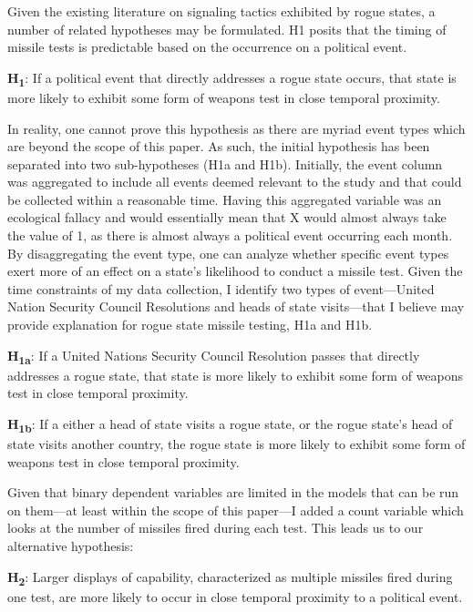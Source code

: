 \documentclass[12pt]{article}
\begin{document}
Given the existing literature on signaling tactics exhibited by rogue states, a number of related hypotheses may be formulated. H1 posits that the timing of missile tests is predictable based on the occurrence on a political event. 

\singlespacing
\textbf{H\textsubscript{1}}: If a political event that directly addresses a rogue state occurs, that state is more likely to exhibit some form of weapons test in close temporal proximity. 

\doublespacing
In reality, one cannot prove this hypothesis as there are myriad event types which are beyond the scope of this paper. As such, the initial hypothesis has been separated into two sub-hypotheses (H1a and H1b). Initially, the event column was aggregated to include all events deemed relevant to the study and that could be collected within a reasonable time. Having this aggregated variable was an ecological fallacy and would essentially mean that X would almost always take the value of 1, as there is almost always a political event occurring each month. By disaggregating the event type, one can analyze whether specific event types exert more of an effect on a state’s likelihood to conduct a missile test. Given the time constraints of my data collection, I identify two types of event—United Nation Security Council Resolutions and heads of state visits—that I believe may provide explanation for rogue state missile testing, H1a and H1b. 

\singlespacing
\textbf{H\textsubscript{1a}}: If a United Nations Security Council Resolution passes that directly addresses a rogue state, that state is more likely to exhibit some form of weapons test in close temporal proximity.

\textbf{H\textsubscript{1b}}: If a either a head of state visits a rogue state, or the rogue state’s head of state visits another country, the rogue state is more likely to exhibit some form of weapons test in close temporal proximity.

\doublespacing
Given that binary dependent variables are limited in the models that can be run on them—at least within the scope of this paper—I added a count variable which looks at the number of missiles fired during each test. This leads us to our alternative hypothesis: 

\singlespacing
\textbf{H\textsubscript{2}}: Larger displays of capability, characterized as multiple missiles fired during one test, are more likely to occur in close temporal proximity to a political event.
\end{document}
